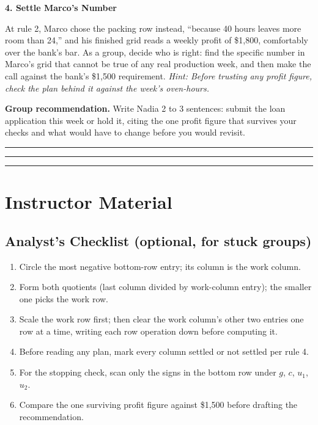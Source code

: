 \documentclass[11pt]{article}
\newcommand{\question}[1]{\medskip\noindent\textbf{#1}\par\smallskip}
\newcommand{\hint}[1]{{\small\color{gray}\textit{Hint: #1}}\par}
\begin{document}
\question{4. Settle Marco's Number}
At rule 2, Marco chose the packing row instead, ``because 40 hours leaves more room than
24,'' and his finished grid reads a weekly profit of \$1{,}800, comfortably over the
bank's bar. As a group, decide who is right: find the specific number in Marco's grid
that cannot be true of any real production week, and then make the call against the
bank's \$1{,}500 requirement.
\hint{Before trusting any profit figure, check the plan behind it against the week's oven-hours.}

\bigskip
\noindent\textbf{Group recommendation.} Write Nadia 2 to 3 sentences: submit the loan
application this week or hold it, citing the one profit figure that survives your checks
and what would have to change before you would revisit.
\par\vspace{12pt}\noindent\rule{\textwidth}{0.5pt}
\par\vspace{16pt}\noindent\rule{\textwidth}{0.5pt}
\par\vspace{16pt}\noindent\rule{\textwidth}{0.5pt}

\newpage

\section*{Instructor Material}

\subsection*{Analyst's Checklist (optional, for stuck groups)}
\begin{enumerate}[leftmargin=*, itemsep=2pt, topsep=3pt]
\item Circle the most negative bottom-row entry; its column is the work column.
\item Form both quotients (last column divided by work-column entry); the smaller one
picks the work row.
\item Scale the work row first; then clear the work column's other two entries one row at
a time, writing each row operation down before computing it.
\item Before reading any plan, mark every column settled or not settled per rule 4.
\item For the stopping check, scan only the signs in the bottom row under $g$, $c$,
$u_1$, $u_2$.
\item Compare the one surviving profit figure against \$1{,}500 before drafting the
recommendation.
\end{enumerate}
\end{document}
